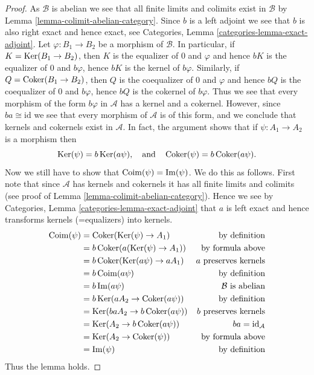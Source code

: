 \begin{proof}
As $\mathcal{B}$ is abelian we see that all finite limits and colimits
exist in $\mathcal{B}$ by Lemma \ref{lemma-colimit-abelian-category}.
Since $b$ is a left adjoint we see that $b$ is also right exact
and hence exact, see
Categories, Lemma \ref{categories-lemma-exact-adjoint}.
Let $\varphi : B_1 \to B_2$ be a morphism of $\mathcal{B}$.
In particular, if $K = \mathop{\mathrm{Ker}}(B_1 \to B_2)$, then $K$ is
the equalizer of $0$ and $\varphi$ and hence
$bK$ is the equalizer of $0$ and $b\varphi$, hence
$bK$ is the kernel of $b\varphi$. Similarly, if
$Q = \mathop{\mathrm{Coker}}(B_1 \to B_2)$, then $Q$ is
the coequalizer of $0$ and $\varphi$ and hence
$bQ$ is the coequalizer of $0$ and $b\varphi$, hence
$bQ$ is the cokernel of $b\varphi$. Thus we see that every morphism
of the form $b\varphi$ in $\mathcal{A}$ has a kernel and a cokernel.
However, since $ba \cong \text{id}$ we see that every morphism of
$\mathcal{A}$ is of this form, and we conclude that kernels and
cokernels exist in $\mathcal{A}$. In fact, the argument shows that
if $\psi : A_1 \to A_2$ is a morphism then
$$
\mathop{\mathrm{Ker}}(\psi) = b\mathop{\mathrm{Ker}}(a\psi),
\quad\text{and}\quad
\mathop{\mathrm{Coker}}(\psi) = b\mathop{\mathrm{Coker}}(a\psi).
$$
Now we still have to show that $\mathop{\mathrm{Coim}}(\psi)= \mathop{\mathrm{Im}}(\psi)$.
We do this as follows.
First note that since $\mathcal{A}$ has kernels and cokernels it
has all finite limits and colimits (see proof of
Lemma \ref{lemma-colimit-abelian-category}).
Hence we see by Categories, Lemma \ref{categories-lemma-exact-adjoint}
that $a$ is left exact and
hence transforms kernels (=equalizers) into kernels.
\begin{align*}
\mathop{\mathrm{Coim}}(\psi)
& =
\mathop{\mathrm{Coker}}(\mathop{\mathrm{Ker}}(\psi) \to A_1)
& \text{by definition} \\
& =
b\mathop{\mathrm{Coker}}(a(\mathop{\mathrm{Ker}}(\psi) \to A_1))
& \text{by formula above} \\
& =
b\mathop{\mathrm{Coker}}(\mathop{\mathrm{Ker}}(a\psi) \to aA_1)
& a\text{ preserves kernels} \\
& =
b\mathop{\mathrm{Coim}}(a\psi)
& \text{by definition} \\
& =
b\mathop{\mathrm{Im}}(a\psi)
& \mathcal{B}\text{ is abelian} \\
& =
b\mathop{\mathrm{Ker}}(aA_2 \to \mathop{\mathrm{Coker}}(a\psi))
& \text{by definition} \\
& =
\mathop{\mathrm{Ker}}(baA_2 \to b\mathop{\mathrm{Coker}}(a\psi))
& b\text{ preserves kernels} \\
& =
\mathop{\mathrm{Ker}}(A_2 \to b\mathop{\mathrm{Coker}}(a\psi))
& ba = \text{id}_\mathcal{A} \\
& =
\mathop{\mathrm{Ker}}(A_2 \to \mathop{\mathrm{Coker}}(\psi))
& \text{by formula above} \\
& =
\mathop{\mathrm{Im}}(\psi)
& \text{by definition}
\end{align*}
Thus the lemma holds.
\end{proof}




